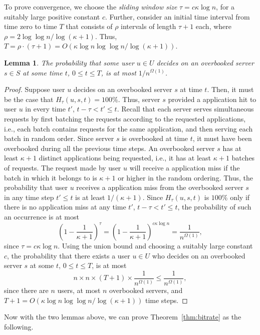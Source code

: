 \documentclass[conference]{IEEEtran}
\newtheorem{lemma}[theorem]{Lemma}
\begin{document}
To prove convergence, we choose the {\em sliding window size} $\tau = c \kappa \log n$, for a suitably  large positive constant $c$. Further, consider an initial time interval from time zero to time $T$ that consists of  $\rho$ intervals of length $\tau + 1$ each, where $\rho = 2 \log\log n/ \log (\kappa + 1)$.  Thus,  $T = \rho \cdot (\tau + 1) =  O(\kappa \log n \log\log n/\log (\kappa + 1))$. 
\begin{lemma}\label{lem:overbookhit2}
The probability that some user $u \in U$ decides on an overbooked server $s \in S$ at some time $t$, $0 \leq t \leq T$,  is at most  $1/n^{\Omega(1)}$. 
\end{lemma}
\begin{proof}
Suppose user $u$ decides on an overbooked server $s$ at time $t$. Then, it must be the case that 
$H_\tau(u,s,t) = 100\%$. Thus, server $s$ provided a application hit to user $u$ in every time $t'$, $t - \tau <  t' \leq  t$. Recall that each server serves simultaneous requests by first batching the requests according to the requested applications, i.e., each batch contains requests for the same application, and then serving each batch in random order. Since server $s$ is overbooked at time $t$, it must have been overbooked during all the previous time steps. An overbooked server $s$ has at least $\kappa + 1$ distinct applications being requested, i.e., it has at least $\kappa + 1$ batches of requests. The request made by user $u$ will receive a application miss if the batch in which it belongs to is $\kappa + 1$ or higher in the random ordering. Thus, the probability that user $u$ receives a application miss from the overbooked server $s$ in any time step $t ' \leq t$ is at least $1 / (\kappa + 1)$. Since $H_\tau(u,s,t)$ is $100\%$ only if there is no application miss at any time $t'$, $t - \tau<  t' \leq  t$, the probability of such an occurrence is at most
$$
\left( 1- \frac{1}{\kappa+1}\right)^\tau = \left(1- \frac{1}{\kappa +1}\right)^{c \kappa \log n} = \frac{1}{n^{\Omega(1)}},
$$
since $\tau = c \kappa \log n$.  Using the union bound and choosing a suitably large constant $c$, the probability that there exists a user $u \in U$ who decides on an overbooked server $s$ at some $t$, $0 \leq t \leq T$,  is at most
$$ n \times n  \times (T + 1) \times \frac{1}{n^{\Omega(1)}} \leq \frac{1}{n^{\Omega(1)}},$$
since there are $n$ users, at most $n$ overbooked servers, and $T + 1 = O(\kappa \log n \log\log n/\log (\kappa+1))$ time steps. 
\end{proof}

Now with the two lemmas above, we can prove Theorem~\ref{thm:bitrate} as the following.
\end{document}

